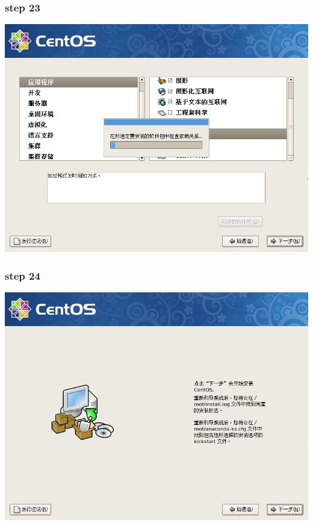 \documentclass[xcolor=svgnames,presentation]{beamer}
\begin{document}
\begin{frame}
\frametitle{step 23}
\label{sec-2-23}

\begin{center}
\includegraphics[width=.9\linewidth]{img/img33.png}
\end{center}
\end{frame}
\begin{frame}
\frametitle{step 24}
\label{sec-2-24}

\begin{center}
\includegraphics[width=.9\linewidth]{img/img34.png}
\end{center}
\end{frame}
\end{document}
